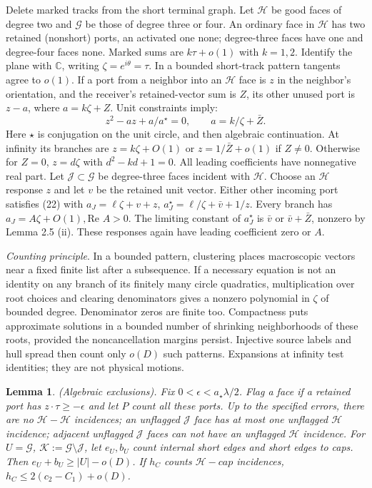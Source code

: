 \documentclass[10pt,reqno]{amsart}
\newtheorem{lemma}{Lemma}[section]
\begin{document}
Delete marked tracks from the short terminal graph. Let $\mathcal{H}$ be good faces of degree two and $\mathcal{G}$ be those of degree three or four. An ordinary face in $\mathcal{H}$ has two retained (nonshort) ports, an activated one none; degree-three faces have one and degree-four faces none. Marked sums are $k \tau + o(1)$ with $k = 1, 2$. Identify the plane with $\mathbb{C}$, writing $\zeta = e^{i \theta} = \tau$. In a bounded short-track pattern tangents agree to $o(1)$. If a port from a neighbor into an $\mathcal{H}$ face is $z$ in the neighbor's orientation, and the receiver's retained-vector sum is $Z$, its other unused port is $z - a$, where $a = k \zeta + Z$. Unit constraints imply:
\begin{equation}
    z^2 - az + a / a^\star = 0, \qquad a = k / \zeta + \bar{Z}.
\end{equation}
Here $\star$ is conjugation on the unit circle, and then algebraic continuation. At infinity its branches are $z = k \zeta + O(1)$ or $z = 1 / \bar{Z} + o(1)$ if $Z \ne 0$. Otherwise for $Z = 0$, $z = d \zeta$ with $d^2 - kd + 1 = 0$. All leading coefficients have nonnegative real part. Let $\mathcal{J} \subset \mathcal{G}$ be degree-three faces incident with $\mathcal{H}$. Choose an $\mathcal{H}$ response $z$ and let $v$ be the retained unit vector. Either other incoming port satisfies (22) with $a_J = \ell \zeta + v + z$, $a_J^\star = \ell / \zeta + \bar{v} + 1 / z$. Every branch has $a_J = A \zeta + O(1), \text{Re }A > 0$. The limiting constant of $a_J^\star$ is $\bar{v}$ or $\bar{v} + \bar{Z}$, nonzero by Lemma 2.5 (ii). These responses again have leading coefficient zero or $A$.

\textit{Counting principle}. In a bounded pattern, clustering places macroscopic vectors near a fixed finite list after a subsequence. If a necessary equation is not an identity on any branch of its finitely many circle quadratics, multiplication over root choices and clearing denominators gives a nonzero polynomial in $\zeta$ of bounded degree. Denominator zeros are finite too. Compactness puts approximate solutions in a bounded number of shrinking neighborhoods of these roots, provided the noncancellation margins persist. Injective source labels and hull spread then count only $o(D)$ such patterns. Expansions at infinity test identities; they are not physical motions.

\begin{lemma}
    (Algebraic exclusions). Fix $0 < \epsilon < a_\star \lambda / 2$. Flag a face if a retained port has $z \cdot \tau \ge - \epsilon$ and let $P$ count all these ports. Up to the specified errors, there are no $\mathcal{H}-\mathcal{H}$ incidences; an unflagged $\mathcal{J}$ face has at most one unflagged $\mathcal{H}$ incidence; adjacent unflagged $\mathcal{J}$ faces can not have an unflagged $\mathcal{H}$ incidence. For $U = \mathcal{G}$, $\mathcal{K} := \mathcal{G} \setminus \mathcal{J}$, let $e_U, b_U$ count internal short edges and short edges to caps. Then $e_U + b_U \ge |U| - o(D)$. If $h_C$ counts $\mathcal{H}-cap$ incidences, $h_C \le 2 (c_2 - C_1) + o(D)$.
\end{lemma}
\end{document}
